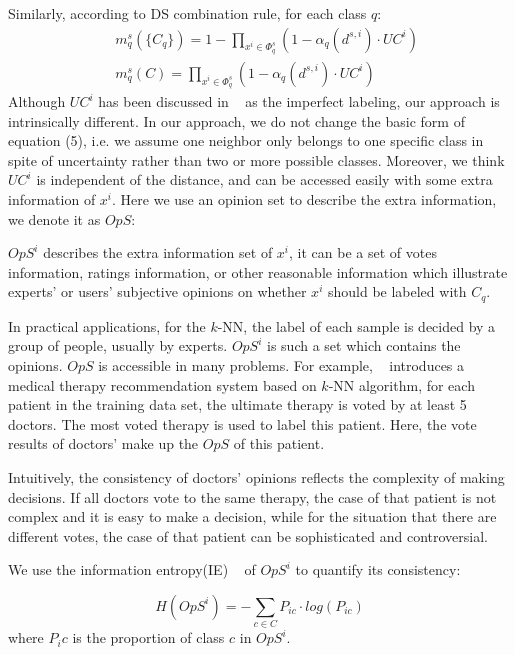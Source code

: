 \documentclass[runningheads]{llncs}
\begin{document}
Similarly, according to DS combination rule, for each class $q$:
\begin{equation}
\begin{split}
&\ m^{s} _q( \{C_q\}) = 1- \prod_{x^i\in \Phi^s _q } (1-\alpha_q(d^{s,i} )\cdot UC^i)
\\
&\ m^{s} _q(C) = \prod_{x^i\in \Phi^s _q } (1-\alpha_q(d^{s,i} )\cdot UC^i)
\end{split}
\end{equation}
Although $UC^i$ has been discussed in ~\cite{ref_article3} as the imperfect labeling, our approach is intrinsically different. In our approach, we do not change the basic form of equation (5), i.e. we assume one neighbor only belongs  to one specific class in spite of uncertainty rather than two or more possible classes. Moreover,  we think $UC^i$ is independent of the distance, and can be accessed easily with some extra information of $x^i$. Here we use an opinion set to describe the extra information, we denote it as $OpS$:
\begin{definition}
 $OpS^i$ describes the extra information set of $x^i$, it can be a set of votes information, ratings information, or other reasonable information which illustrate experts' or users' subjective opinions on whether $x^i$ should be labeled with $C_q$.
\end{definition}
In practical applications, for the $k$-NN, the label of each sample is decided by a group of people, usually by experts. $OpS^i$ is such a set which contains the opinions. $OpS$ is accessible in many problems. For example, ~\cite{ref_article9} introduces a medical therapy recommendation system based on $k$-NN algorithm, for each patient in the training data set,  the ultimate therapy is voted by at least 5 doctors. The most voted therapy is used to label this patient. Here, the vote results of doctors' make up the $OpS$ of this patient.

Intuitively, the consistency of doctors' opinions reflects the complexity of making decisions. If all doctors vote to the same therapy, the case of that patient is not complex and it is easy to make a decision, while for the situation that there are different votes, the case of that patient can be sophisticated and controversial. 

We use the information entropy(IE) ~\cite{ref_article12} of $OpS^i$ to quantify its consistency:

\begin{equation}
H(OpS^i) =- \sum_{c \in C} P_{ic} \cdot log (P_{ic})
\end{equation}
where $P_ic$ is the proportion of class $c$ in $OpS^i$.
\end{document}
